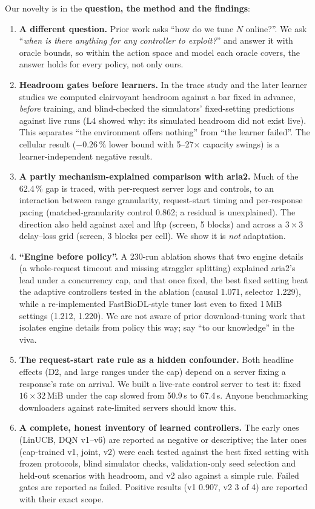 Our novelty is in the \textbf{question, the method and the findings}:
\begin{enumerate}
\item \textbf{A different question.} Prior work asks ``how do we tune $N$ online?''. We ask ``\emph{when is there anything for any controller to exploit?}'' and answer it with oracle bounds, so within the action space and model each oracle covers, the answer holds for every policy, not only ours.
\item \textbf{Headroom gates before learners.} In the trace study and the later learner studies we computed clairvoyant headroom against a bar fixed in advance, \emph{before} training, and blind-checked the simulators' fixed-setting predictions against live runs (L4 showed why: its simulated headroom did not exist live). This separates ``the environment offers nothing'' from ``the learner failed''. The cellular result ($-0.26$\,\% lower bound with 5--27$\times$ capacity swings) is a learner-independent negative result.
\item \textbf{A partly mechanism-explained comparison with aria2.} Much of the 62.4\,\% gap is traced, with per-request server logs and controls, to an interaction between range granularity, request-start timing and per-response pacing (matched-granularity control 0.862; a residual is unexplained). The direction also held against axel and lftp (screen, 5 blocks) and across a $3\times3$ delay--loss grid (screen, 3 blocks per cell). We show it is \emph{not} adaptation.
\item \textbf{``Engine before policy''.} A 230-run ablation shows that two engine details (a whole-request timeout and missing straggler splitting) explained aria2's lead under a concurrency cap, and that once fixed, the best fixed setting beat the adaptive controllers tested in the ablation (causal 1.071, selector 1.229), while a re-implemented FastBioDL-style tuner lost even to fixed 1\,MiB settings (1.212, 1.220). We are not aware of prior download-tuning work that isolates engine details from policy this way; say ``to our knowledge'' in the viva.
\item \textbf{The request-start rate rule as a hidden confounder.} Both headline effects (D2, and large ranges under the cap) depend on a server fixing a response's rate on arrival. We built a live-rate control server to test it: fixed $16\times32$\,MiB under the cap slowed from 50.9\,s to 67.4\,s. Anyone benchmarking downloaders against rate-limited servers should know this.
\item \textbf{A complete, honest inventory of learned controllers.} The early ones (LinUCB, DQN v1--v6) are reported as negative or descriptive; the later ones (cap-trained v1, joint, v2) were each tested against the best fixed setting with frozen protocols, blind simulator checks, validation-only seed selection and held-out scenarios with headroom, and v2 also against a simple rule. Failed gates are reported as failed. Positive results (v1 0.907, v2 3 of 4) are reported with their exact scope.

\end{enumerate}
